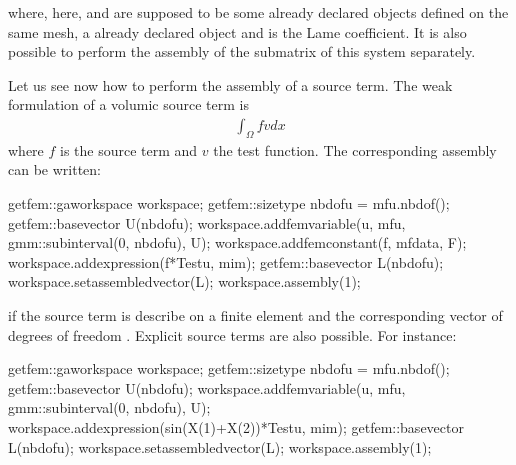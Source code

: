 \documentclass[a4paper,11pt,english]{sphinxmanual}
\begin{document}
where, here,  and  are supposed to be some already declared  objects defined on the same mesh,  a already declared  object and  is the Lame coefficient. It is also possible to perform the assembly of the sub\sphinxhyphen{}matrix of this system separately.

Let us see now how to perform the assembly of a source term. The weak formulation of a volumic source term is
\begin{equation*}
\begin{split}\int_{\Omega} fv dx\end{split}
\end{equation*}
where \(f\) is the source term and \(v\) the test function. The corresponding assembly can be written:

\begin{sphinxVerbatim}[commandchars=\\\{\}]
getfem::ga\PYGZus{}workspace workspace;
getfem::size\PYGZus{}type nbdofu = mf\PYGZus{}u.nb\PYGZus{}dof();
getfem::base\PYGZus{}vector U(nbdofu);
workspace.add\PYGZus{}fem\PYGZus{}variable(\PYGZdq{}u\PYGZdq{}, mf\PYGZus{}u, gmm::sub\PYGZus{}interval(0, nbdofu), U);
workspace.add\PYGZus{}fem\PYGZus{}constant(\PYGZdq{}f\PYGZdq{}, mf\PYGZus{}data, F);
workspace.add\PYGZus{}expression(\PYGZdq{}f*Test\PYGZus{}u\PYGZdq{}, mim);
getfem::base\PYGZus{}vector L(nbdofu);
workspace.set\PYGZus{}assembled\PYGZus{}vector(L);
workspace.assembly(1);
\end{sphinxVerbatim}

if the source term is describe on a finite element  and the corresponding vector of degrees of freedom . Explicit source terms are also possible. For instance:

\begin{sphinxVerbatim}[commandchars=\\\{\}]
getfem::ga\PYGZus{}workspace workspace;
getfem::size\PYGZus{}type nbdofu = mf\PYGZus{}u.nb\PYGZus{}dof();
getfem::base\PYGZus{}vector U(nbdofu);
workspace.add\PYGZus{}fem\PYGZus{}variable(\PYGZdq{}u\PYGZdq{}, mf\PYGZus{}u, gmm::sub\PYGZus{}interval(0, nbdofu), U);
workspace.add\PYGZus{}expression(\PYGZdq{}sin(X(1)+X(2))*Test\PYGZus{}u\PYGZdq{}, mim);
getfem::base\PYGZus{}vector L(nbdofu);
workspace.set\PYGZus{}assembled\PYGZus{}vector(L);
workspace.assembly(1);
\end{sphinxVerbatim}
\end{document}
